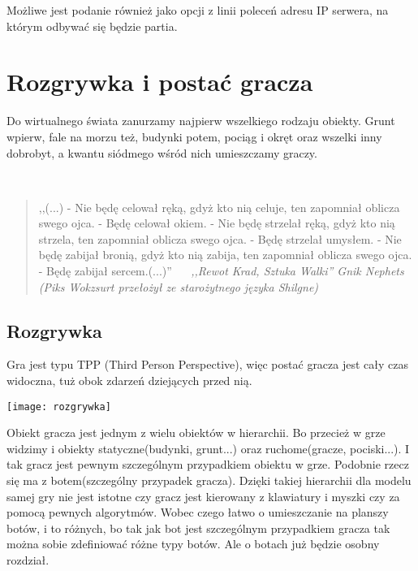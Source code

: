 \documentclass[licencjacka]{pracamgr}
\begin{document}
Możliwe jest podanie również jako opcji z linii poleceń adresu IP serwera, na którym odbywać się będzie partia.


\chapter{Rozgrywka i postać gracza}

Do wirtualnego świata zanurzamy najpierw wszelkiego rodzaju obiekty. Grunt wpierw, fale na morzu też, budynki potem, pociąg i okręt oraz wszelki inny dobrobyt, a kwantu siódmego wśród nich umieszczamy graczy.

\ \

\begin{quote}
,,(...)
\newline- Nie będę celował ręką, gdyż kto nią celuje, ten zapomniał oblicza swego ojca.
\newline- Będę celował okiem.
\newline- Nie będę strzelał ręką, gdyż kto nią strzela, ten zapomniał oblicza swego ojca.
\newline- Będę strzelał umysłem.
\newline- Nie będę zabijał bronią, gdyż kto nią zabija, ten zapomniał oblicza swego ojca.
\newline- Będę zabijał sercem.(...)''
\ \
\newline
\newline
\raggedleft\slshape ,,Rewot Krad, Sztuka Walki'' Gnik Nephets (Piks Wokzsurt przełożył ze starożytnego języka Shilgne) %
\end{quote}

\section{Rozgrywka}

Gra jest typu TPP (Third Person Perspective), więc postać gracza jest cały czas widoczna, tuż obok zdarzeń
dziejących przed nią.
\begin{center}
\texttt{[image: rozgrywka]}
\end{center}
Obiekt gracza jest jednym z wielu obiektów w hierarchii. Bo przecież
w grze widzimy i obiekty statyczne(budynki, grunt...) oraz
ruchome(gracze, pociski...). I tak gracz jest pewnym szczególnym
przypadkiem obiektu w grze. Podobnie rzecz się ma z botem(szczególny
przypadek gracza). Dzięki takiej hierarchii dla modelu samej gry nie
jest istotne czy gracz jest kierowany z klawiatury i myszki czy za
pomocą pewnych algorytmów. Wobec czego łatwo o umieszczanie na
planszy botów, i to różnych, bo tak jak bot jest szczególnym
przypadkiem gracza tak można sobie zdefiniować różne typy botów. Ale
o botach już
będzie osobny rozdział. \\ \\
\end{document}
